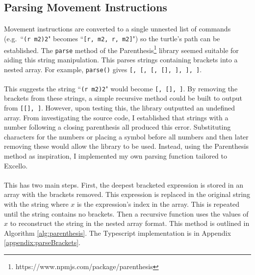 \subsection{Parsing Movement Instructions}

\paragraph{} Movement instructions are converted to a single unnested list of commands (e.g.~``\texttt{(r m2)2}" becomes ``\texttt{[r, m2, r, m2]}") so the turtle's path can be established. The \texttt{parse} method of the Parenthesis\footnote{https://www.npmjs.com/package/parenthesis} library seemed suitable for aiding this string manipulation. This parses strings containing brackets into a nested array. For example, \texttt{parse(\textcolor[rgb]{0,0.7,0}{})} gives \texttt{[\textcolor[rgb]{0,0.7,0}{}, [\textcolor[rgb]{0,0.7,0}{\upquote{b[}}, [\textcolor[rgb]{0,0.7,0}{}, [\textcolor[rgb]{0,0.7,0}{}], \textcolor[rgb]{0,0.7,0}{\upquote{\}}}], \textcolor[rgb]{0,0.7,0}{\upquote{]}}], \textcolor[rgb]{0,0.7,0}{\upquote{)}}]}.

\paragraph{} This suggests the string ``\texttt{(r m2)2}" would become \texttt{[\upquote{(}, [], ]}. By removing the brackets from these strings, a simple recursive method could be built to output \texttt{} from \texttt{[[], ]}. However, upon testing this, the library outputted an undefined array. From investigating the source code, I established that strings with a number following a closing parenthesis all produced this error. Substituting characters for the numbers or placing a symbol before all numbers and then later removing these would allow the library to be used. Instead, using the Parenthesis method as inspiration, I implemented my own parsing function tailored to Excello.

\paragraph{} This has two main steps. First, the deepest bracketed expression is stored in an array with the brackets removed. This expression is replaced in the original string with the string  where $x$ is the expression's index in the array. This is repeated until the string contains no brackets. Then a recursive function uses the values of $x$ to reconstruct the string in the nested array format. This method is outlined in Algorithm \ref{alg:parenthesis}. The Typescript implementation is in Appendix \ref{appendix:parseBrackets}.

